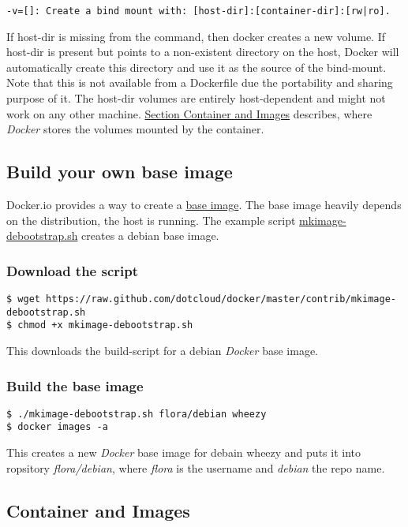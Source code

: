 \documentclass[11pt]{article}
\begin{document}
\begin{verbatim}
-v=[]: Create a bind mount with: [host-dir]:[container-dir]:[rw|ro].
\end{verbatim}
If host-dir is missing from the command, then docker creates a new volume. If host-dir is present but points to a non-existent directory on the host, Docker will automatically create this directory and use it as the source of the bind-mount.
Note that this is not available from a Dockerfile due the portability and sharing purpose of it. The host-dir volumes are entirely host-dependent and might not work on any other machine. \hyperref[sec-2-5]{Section Container and Images} describes, where \emph{Docker} stores the volumes mounted by the container.
\subsection{Build your own base image}
\label{sec-2-4}

Docker.io provides a way to create a \href{http://docs.docker.io/en/latest/articles/baseimages/}{base image}. The base image heavily depends on the distribution, the host is running. The example script \href{https://github.com/dotcloud/docker/blob/master/contrib/mkimage-debootstrap.sh}{mkimage-debootstrap.sh} creates a debian base image.
\subsubsection{Download the script}
\label{sec-2-4-1}


\begin{verbatim}
$ wget https://raw.github.com/dotcloud/docker/master/contrib/mkimage-debootstrap.sh
$ chmod +x mkimage-debootstrap.sh
\end{verbatim}
This downloads the build-script for a debian \emph{Docker} base image.
\subsubsection{Build the base image}
\label{sec-2-4-2}


\begin{verbatim}
$ ./mkimage-debootstrap.sh flora/debian wheezy 
$ docker images -a
\end{verbatim}
This creates a new \emph{Docker} base image for debain wheezy and puts it into ropsitory \emph{flora/debian}, where \emph{flora} is the username and \emph{debian} the repo name.
\subsection{Container and Images}
\label{sec-2-5}
\end{document}
